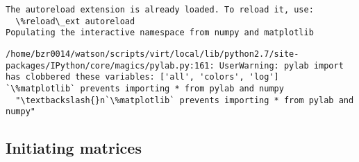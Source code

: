\documentclass[11pt]{article}
\begin{document}
    \begin{Verbatim}[commandchars=\\\{\}]
The autoreload extension is already loaded. To reload it, use:
  \%reload\_ext autoreload
Populating the interactive namespace from numpy and matplotlib

    \end{Verbatim}

    \begin{Verbatim}[commandchars=\\\{\}]
/home/bzr0014/watson/scripts/virt/local/lib/python2.7/site-packages/IPython/core/magics/pylab.py:161: UserWarning: pylab import has clobbered these variables: ['all', 'colors', 'log']
`\%matplotlib` prevents importing * from pylab and numpy
  "\textbackslash{}n`\%matplotlib` prevents importing * from pylab and numpy"

    \end{Verbatim}

    \subsection{Initiating matrices}\label{initiating-matrices}
\end{document}
